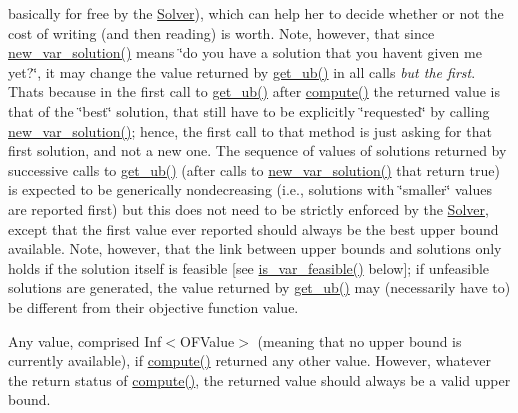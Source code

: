 \begin{DoxyItemize}
basically for free by the \mbox{\hyperlink{class_s_m_spp__di__unipi__it_1_1_solver}{Solver}}), which can help her to decide whether or not the cost of writing (and then reading) is worth. Note, however, that since \mbox{\hyperlink{class_s_m_spp__di__unipi__it_1_1_solver_af109b504a566c90a4ea45c1574c128fe}{new\+\_\+var\+\_\+solution()}} means \char`\"{}do you have a solution that you
     haven\textquotesingle{}t given me yet?\char`\"{}, it may change the value returned by \mbox{\hyperlink{class_s_m_spp__di__unipi__it_1_1_solver_a7304d819b2eeff3d4ba650055b24e3a5}{get\+\_\+ub()}} in all calls {\itshape but the first}. That\textquotesingle{}s because in the first call to \mbox{\hyperlink{class_s_m_spp__di__unipi__it_1_1_solver_a7304d819b2eeff3d4ba650055b24e3a5}{get\+\_\+ub()}} after \mbox{\hyperlink{class_s_m_spp__di__unipi__it_1_1_solver_a504d4e3e174c7a518cc66156a8a45ce5}{compute()}} the returned value is that of the \char`\"{}best\char`\"{} solution, that still have to be explicitly \char`\"{}requested\char`\"{} by calling \mbox{\hyperlink{class_s_m_spp__di__unipi__it_1_1_solver_af109b504a566c90a4ea45c1574c128fe}{new\+\_\+var\+\_\+solution()}}; hence, the first call to that method is just asking for that first solution, and not a new one. The sequence of values of solutions returned by successive calls to \mbox{\hyperlink{class_s_m_spp__di__unipi__it_1_1_solver_a7304d819b2eeff3d4ba650055b24e3a5}{get\+\_\+ub()}} (after calls to \mbox{\hyperlink{class_s_m_spp__di__unipi__it_1_1_solver_af109b504a566c90a4ea45c1574c128fe}{new\+\_\+var\+\_\+solution()}} that return true) is expected to be generically nondecreasing (i.\+e., solutions with \char`\"{}smaller\char`\"{} values are reported first) but this does not need to be strictly enforced by the \mbox{\hyperlink{class_s_m_spp__di__unipi__it_1_1_solver}{Solver}}, except that the first value ever reported should always be the best upper bound available. Note, however, that the link between upper bounds and solutions only holds if the solution itself is feasible \mbox{[}see \mbox{\hyperlink{class_s_m_spp__di__unipi__it_1_1_solver_a038fa1e554e91724e1ce3f593aba55fd}{is\+\_\+var\+\_\+feasible()}} below\mbox{]}; if unfeasible solutions are generated, the value returned by \mbox{\hyperlink{class_s_m_spp__di__unipi__it_1_1_solver_a7304d819b2eeff3d4ba650055b24e3a5}{get\+\_\+ub()}} may (necessarily have to) be different from their objective function value.
\item Any value, comprised Inf$<$\+O\+F\+Value$>$ (meaning that no upper bound is currently available), if \mbox{\hyperlink{class_s_m_spp__di__unipi__it_1_1_solver_a504d4e3e174c7a518cc66156a8a45ce5}{compute()}} returned any other value. However, whatever the return status of \mbox{\hyperlink{class_s_m_spp__di__unipi__it_1_1_solver_a504d4e3e174c7a518cc66156a8a45ce5}{compute()}}, the returned value should always be a valid upper bound.
\end{DoxyItemize}

